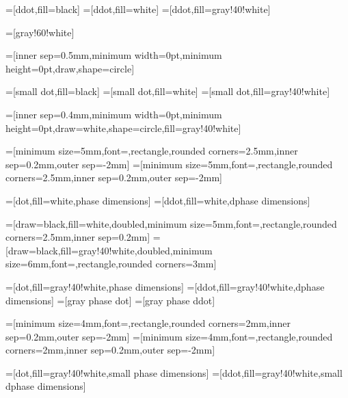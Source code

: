 =[ddot,fill=black]
=[ddot,fill=white]
=[ddot,fill=gray!40!white]

=[gray!60!white]


=[inner sep=0.5mm,minimum width=0pt,minimum height=0pt,draw,shape=circle]

=[small dot,fill=black]
=[small dot,fill=white]
=[small dot,fill=gray!40!white]

=[inner sep=0.4mm,minimum width=0pt,minimum height=0pt,draw=white,shape=circle,fill=gray!40!white]


=[minimum size=5mm,font=\footnotesize,rectangle,rounded corners=2.5mm,inner sep=0.2mm,outer sep=-2mm]
=[minimum size=5mm,font=\footnotesize,rectangle,rounded corners=2.5mm,inner sep=0.2mm,outer sep=-2mm]

=[dot,fill=white,phase dimensions]
=[ddot,fill=white,dphase dimensions]

=[draw=black,fill=white,doubled,minimum size=5mm,font=\footnotesize,rectangle,rounded corners=2.5mm,inner sep=0.2mm]
=[draw=black,fill=gray!40!white,doubled,minimum size=6mm,font=\footnotesize,rectangle,rounded corners=3mm]

=[dot,fill=gray!40!white,phase dimensions]
=[ddot,fill=gray!40!white,dphase dimensions]
=[gray phase dot]
=[gray phase ddot]

=[minimum size=4mm,font=\tiny,rectangle,rounded corners=2mm,inner sep=0.2mm,outer sep=-2mm]
=[minimum size=4mm,font=\tiny,rectangle,rounded corners=2mm,inner sep=0.2mm,outer sep=-2mm]

=[dot,fill=gray!40!white,small phase dimensions]
=[ddot,fill=gray!40!white,small dphase dimensions]

